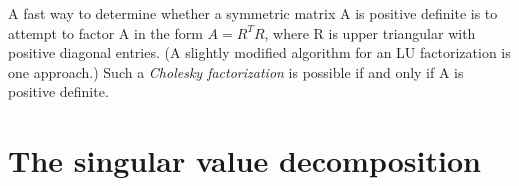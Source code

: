 \begin{note}
    A fast way to determine whether a symmetric matrix A is positive definite is to attempt to factor A in the form \(A = R^TR\), where R is upper triangular with positive diagonal entries. 
    (A slightly modified algorithm for an LU factorization is one approach.)
    Such a \textit{Cholesky factorization} is possible if and only if A is positive definite.
\end{note}

\section{The singular value decomposition}

